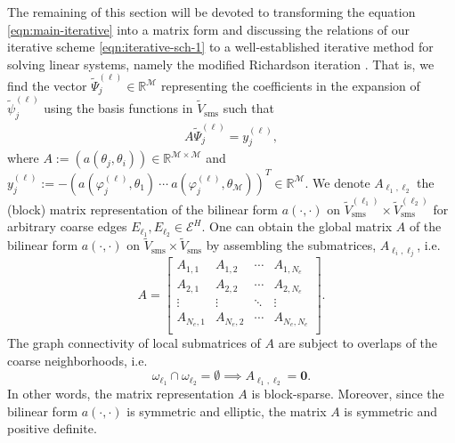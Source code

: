 \documentclass{article}[11pt]
\theoremstyle{definition}
\begin{document}
The remaining of this section will be devoted to transforming the equation \eqref{eqn:main-iterative} into a matrix form and discussing the relations of our iterative scheme \eqref{eqn:iterative-sch-1} to a well-established iterative method for solving linear systems, namely the modified Richardson iteration \cite{richardson1910,saad_book}. That is, we find the vector $\tilde \Psi_j^{(\ell)} \in \mathbb{R}^\mathcal{M}$ representing the coefficients in the expansion of $\tilde \psi_j^{(\ell)}$ using the basis functions in $\tilde V_{\text{sms}}$ such that 
\begin{eqnarray}\label{eqn:main-iterative-mat}
A \tilde \Psi_j^{(\ell)} = y_j^{(\ell)}, 
\end{eqnarray}
where $A := \left ( a(\theta_j, \theta_i) \right ) \in \mathbb{R}^{\mathcal{M} \times \mathcal{M}}$ and $y_j^{(\ell)} := -\left ( a(\varphi_j^{(\ell)},\theta_1) ~ \cdots ~ a(\varphi_j^{(\ell)},\theta_\mathcal{M}) \right )^T \in \mathbb{R}^{\mathcal{M}}$. 
We denote $A_{\ell_1,\ell_2}$ the (block) matrix representation of the bilinear form $a(\cdot,\cdot)$ 
on $\tilde V^{(\ell_1)}_{\text{sms}} \times \tilde V^{(\ell_2)}_{\text{sms}}$ for arbitrary coarse edges $E_{\ell_1}, E_{\ell_2} \in \mathcal{E}^H$. 
One can obtain the global matrix $A$ of the bilinear form $a(\cdot,\cdot)$ on $\tilde V_{\text{sms}} \times \tilde V_{\text{sms}}$ 
by assembling the submatrices, $A_{\ell_i, \ell_j}$, i.e. 
$$
A=\left[
\begin{array}{cccc}
A_{1,1} & A_{1,2} & \cdots & A_{1,N_e}\\
A_{2,1} & A_{2,2} & \cdots & A_{2,N_e}\\
\vdots & \vdots & \ddots & \vdots\\
A_{N_e,1} & A_{N_e,2} & \cdots & A_{N_e,N_e}\\
\end{array}\right]. 
$$
The graph connectivity of local submatrices of $A$ are subject to overlaps of the coarse neighborhoods, i.e. 
$$
\omega_{\ell_1} \cap \omega_{\ell_2} = \emptyset \implies A_{\ell_1,\ell_2} = \mathbf{0}.
$$
In other words, the matrix representation $A$ is block-sparse. 
Moreover, since the bilinear form $a(\cdot,\cdot)$ is symmetric and elliptic, 
the matrix $A$ is symmetric and positive definite. 
\end{document}
